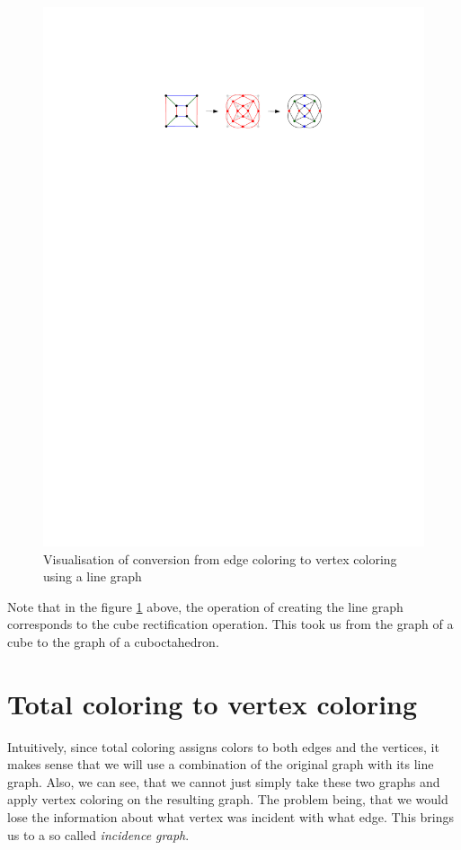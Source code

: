 \begin{figure}[H]
    \centering
    \includegraphics[width=1\textwidth]{../Resources/Figs/cubical_line_graph.pdf}
    \caption{Visualisation of conversion from edge coloring to vertex coloring using a line graph}
    \label{fig:cubical_line_graph}
\end{figure}

Note that in the figure \ref{fig:cubical_line_graph} above, the operation of creating the line graph corresponds to the cube rectification operation. This took us from the graph of a cube to the graph of a cuboctahedron.

\section{Total coloring to vertex coloring}

Intuitively, since total coloring assigns colors to both edges and the vertices, it makes sense that we will use a combination of the original graph with its line graph. Also, we can see, that we cannot just simply take these two graphs and apply vertex coloring on the resulting graph. The problem being, that we would lose the information about what vertex was incident with what edge. This brings us to a so called \textit{incidence graph}.

